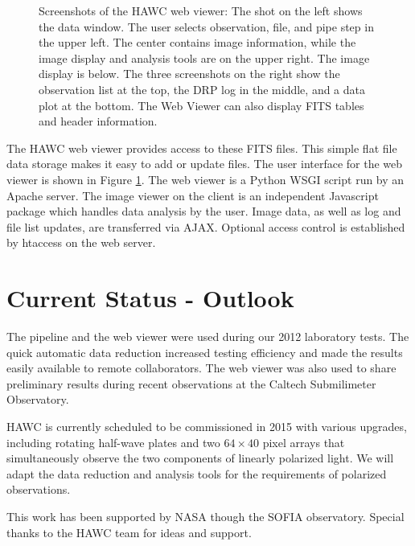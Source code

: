 \begin{figure}[!ht]

\caption{Screenshots of the HAWC web viewer: The shot on the left shows the data window. The user selects observation, file, and pipe step in the upper left. The center contains image information, while the image display and analysis tools are on the upper right. The image display is below. The three screenshots on the right show the observation list at the top, the DRP log in the middle, and a data plot at the bottom. The Web Viewer can also display FITS tables and header information.}

\label{fig_screen}

\end{figure}

The HAWC web viewer provides access to these FITS files. This simple flat file data storage makes it easy to add or update files. The user interface for the web viewer is shown in Figure \ref{fig_screen}. The web viewer is a Python WSGI script run by an Apache server. The image viewer on the client is an independent Javascript package which handles data analysis by the user. Image data, as well as log and file list updates, are transferred via AJAX. Optional access control is established by htaccess on the web server.

\section{Current Status - Outlook}

The pipeline and the web viewer were used during our 2012 laboratory tests. The quick automatic data reduction increased testing efficiency and made the results easily available to remote collaborators. The web viewer was also used to share preliminary results during recent observations at the Caltech Submilimeter Observatory.

HAWC is currently scheduled to be commissioned in 2015 with various upgrades, including rotating half-wave plates and two $64\times40$ pixel arrays that simultaneously observe the two components of linearly polarized light. We will adapt the data reduction and analysis tools for the requirements of polarized observations.

\acknowledgements This work has been supported by NASA though the SOFIA observatory. Special thanks to the HAWC team for ideas and support.



